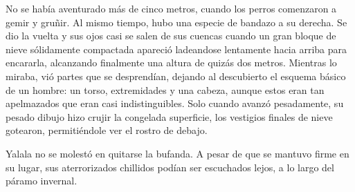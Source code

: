 No se había aventurado más de cinco metros, cuando los perros comenzaron a gemir y gruñir. Al mismo tiempo, hubo una especie de bandazo a su derecha. Se dio la vuelta y sus ojos casi se salen de sus cuencas cuando un gran bloque de nieve sólidamente compactada apareció ladeandose lentamente hacia arriba para encararla, alcanzando finalmente una altura de quizás dos metros. Mientras lo miraba, vió partes que se desprendían, dejando al descubierto el esquema básico de un hombre: un torso, extremidades y una cabeza, aunque estos eran tan apelmazados que eran casi indistinguibles. Solo cuando avanzó pesadamente, su pesado dibujo hizo crujir la congelada superficie, los vestigios finales de nieve gotearon, permitiéndole ver el rostro de debajo.
 
Yalala no se molestó en quitarse la bufanda. A pesar de que se mantuvo firme en su lugar, sus aterrorizados chillidos podían ser escuchados lejos, a lo largo del páramo invernal.
